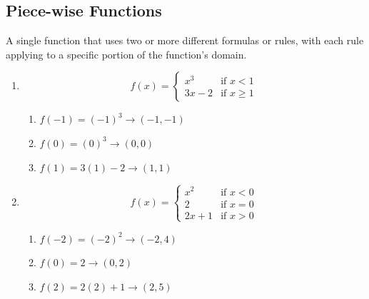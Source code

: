 \subsection{Piece-wise Functions}
\begin{definition}
	A single function that uses two or more different formulas or rules, with each rule applying to a specific portion of the function's domain.
\end{definition}

\begin{example}[Algebraic]
	\hfill
	\begin{enumerate}
		\item $$f(x) = \begin{cases}
		 	   x^3 & \text{if } x < 1 \\
			   3x - 2 & \text{if } x \ge 1
			\end{cases}$$
		\begin{enumerate}
			\item $f(-1) = (-1)^3 \to (-1, -1)$
			\item $f(0) = (0)^3 \to (0, 0)$
			\item $f(1) = 3(1) - 2 \to (1, 1)$
		\end{enumerate}
		\item $$f(x) = \begin{cases}
			   x^2 & \text{if } x < 0 \\
			   2 & \text{if } x = 0 \\
			   2x + 1 & \text{if } x > 0
			\end{cases}$$
		\begin{enumerate}
			\item $f(-2) = (-2)^2 \to (-2, 4)$
			\item $f(0) = 2 \to (0, 2)$
			\item $f(2) = 2(2) + 1 \to (2, 5)$
		\end{enumerate}
	\end{enumerate}
\end{example}

